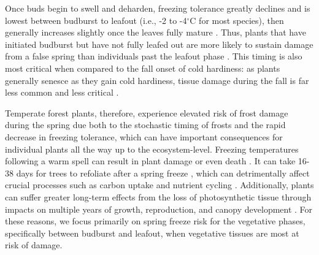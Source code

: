 \documentclass{article}\usepackage[]{graphicx}\usepackage[]{color}
\begin{document}
Once buds begin to swell and deharden, freezing tolerance greatly declines and is lowest between budburst to leafout (i.e., -2 to -4$^{\circ}$C for most species), then generally increases slightly once the leaves fully mature \citep[] [i.e., at this stage most species can sustain temperatures at least 1-4$^{\circ}$C lower than they can between budburst to leafout ]{Sakai1987, Lenz2013}. Thus, plants that have initiated budburst but have not fully leafed out are more likely to sustain damage from a false spring than individuals past the leafout phase \citep{Lenz2016}. This timing is also most critical when compared to the fall onset of cold hardiness: as plants generally senesce as they gain cold hardiness, tissue damage during the fall is far less common and less critical \citep{Estiarte2015, Liu2018}.  

Temperate forest plants, therefore, experience elevated risk of frost damage during the spring due both to the stochastic timing of frosts and the rapid decrease in freezing tolerance, which can have important consequences for individual plants all the way up to the ecosystem-level. Freezing temperatures following a warm spell can result in plant damage or even death \citep{Ludlum1968, Mock2007}. It can take 16-38 days for trees to refoliate after a spring freeze \citep{Augspurger2009, Augspurger2013, Gu2008, Menzel2015}, which can detrimentally affect crucial processes such as carbon uptake and nutrient cycling \citep{Hufkens2012, Klosterman2018, Richardson2013}. Additionally, plants can suffer greater long-term effects from the loss of photosynthetic tissue through impacts on multiple years of growth, reproduction, and canopy development \citep{Vitasse2014, Xie2015}.  For these reasons, we focus primarily on spring freeze risk for the vegetative phases, specifically between budburst and leafout, when vegetative tissues are most at risk of damage.
\end{document}
